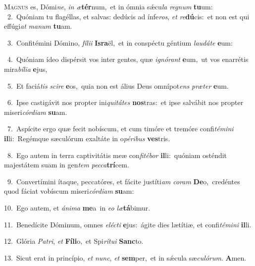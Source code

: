 \lettrine{\initial\textcolor{\initialcolor}{M}}{agnus} es, Dómi\-\textit{ne}\-, \textit{in} \textit{æ}\-\textbf{tér}num,~\star et in ómnia sǽcu\textit{la} \textit{re}\-\textit{gnum} \textbf{tu}\-um:\\
{\numbfont\textcolor{\numbcolor}{~2.}}~Quóniam tu flagéllas, et salvas: dedúcis ad ínfe\-\textit{ros}\-, \textit{et} \textit{re}\-\textbf{dú}cis:~\star et non est qui effúgi\textit{at} \textit{ma}\-\textit{num} \textbf{tu}\-am.\par
{\numbfont\textcolor{\numbcolor}{~3.}}~Confitémini Dómino, \textit{fí}\-\textit{li}\textit{i} \textbf{Is}\-\textbf{ra}ël,~\star et in conspéctu géntium \textit{lau}\-\textit{dá}\textit{te} \textbf{e}\-um:\par
{\numbfont\textcolor{\numbcolor}{~4.}}~Quóniam ídeo dispérsit vos inter gentes, quæ \textit{i}\-\textit{gnó}\textit{rant} \textbf{e}\-um,~\star ut vos enarrétis mira\-\textit{bí}\-\textit{li}\textit{a} \textbf{e}\-jus,\par
{\numbfont\textcolor{\numbcolor}{~5.}}~Et faciá\textit{tis} \textit{sci}\-\textit{re} \textbf{e}\-os,~\star quia non est álius Deus omnípot\textit{ens} \textit{præ}\-\textit{ter} \textbf{e}\-um.\par
{\numbfont\textcolor{\numbcolor}{~6.}}~Ipse castigávit nos propter ini\-\textit{qui}\-\textit{tá}\textit{tes} \textbf{nos}\-tras:~\star et ipse salvábit nos propter miseri\-\textit{cór}\-\textit{di}\textit{am} \textbf{su}\-am.\par
{\numbfont\textcolor{\numbcolor}{~7.}}~Aspícite ergo quæ fecit nobíscum, et cum timóre et tremóre confi\-\textit{té}\-\textit{mi}\textit{ni} \textbf{il}\-li:~\star Regémque sæculórum exaltáte in o\-\textit{pé}\-\textit{ri}\textit{bus} \textbf{ves}\-tris.\par
{\numbfont\textcolor{\numbcolor}{~8.}}~Ego autem in terra captivitátis meæ con\-\textit{fi}\-\textit{té}\textit{bor} \textbf{il}\-li:~\star quóniam osténdit majestátem suam in gen\textit{tem} \textit{pec}\-\textit{ca}\textbf{trí}cem.\par
{\numbfont\textcolor{\numbcolor}{~9.}}~Convertímini ítaque, peccatóres, et fácite justíti\textit{am} \textit{co}\-\textit{ram} \textbf{De}\-o,~\star credéntes quod fáciat vobíscum miseri\-\textit{cór}\-\textit{di}\textit{am} \textbf{su}\-am:\par
{\numbfont\textcolor{\numbcolor}{10.}}~Ego autem, et \textit{á}\-\textit{ni}\textit{ma} \textbf{me}\-a~\star in \textit{e}\-\textit{o} \textit{læ}\-\textbf{tá}bimur.\par
{\numbfont\textcolor{\numbcolor}{11.}}~Benedícite Dóminum, omnes \textit{e}\-\textit{léc}\textit{ti} \textbf{e}\-jus:~\star ágite dies lætítiæ, et confi\-\textit{té}\-\textit{mi}\textit{ni} \textbf{il}\-li.\par
{\numbfont\textcolor{\numbcolor}{12.}}~Glória \textit{Pa}\-\textit{tri}, \textit{et} \textbf{Fí}\-\textbf{li}o,~\star et Spi\-\textit{rí}\-\textit{tu}\textit{i} \textbf{Sanc}\-to.\par
{\numbfont\textcolor{\numbcolor}{13.}}~Sicut erat in princípio, \textit{et} \textit{nunc}\-, \textit{et} \textbf{sem}\-per,~\star et in sǽcula sæ\-\textit{cu}\-\textit{ló}\textit{rum}. \textbf{A}\-men.\par
